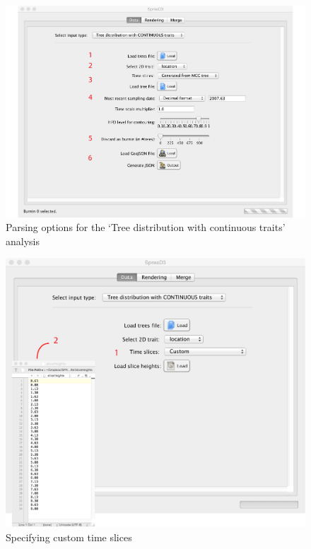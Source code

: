 \documentclass[english]{paper}
\begin{document}
\begin{figure}[!H]
\centering
\includegraphics[width=1\textwidth]{./figures/Fig_parseTrees.pdf} 
\caption{Parsing options for the `Tree distribution with continuous traits' analysis}
\label{fig:parsePosterior}
\end{figure}

\begin{figure}[!H]
\centering
\includegraphics[width=1\textwidth]{./figures/customTimeSlices.pdf} 
\caption{Specifying custom time slices}
\label{fig:customTimeSlices}
\end{figure}
\end{document}
